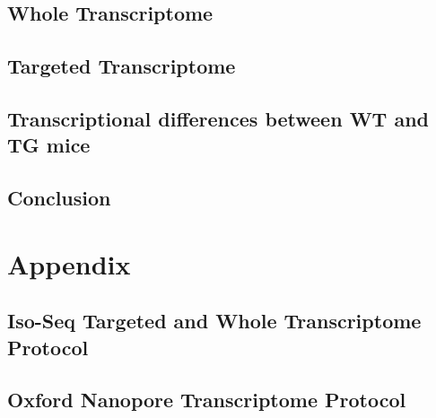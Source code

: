 \documentclass[a4paper,12pt,oneside]{report}
\begin{document}
\chapter{Whole Transcriptome}


\chapter{Targeted Transcriptome}


\chapter{Transcriptional differences between WT and TG mice}
%
%


\chapter{Conclusion}
%

\newpage
\part{Appendix} %
\begin{appendix}
\chapter{Iso-Seq Targeted and Whole Transcriptome Protocol}

\chapter{Oxford Nanopore Transcriptome Protocol}
%
\end{appendix}


\end{document}
